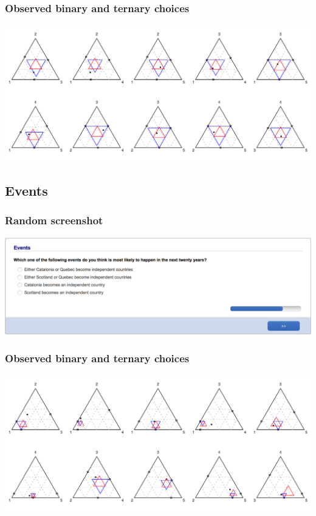 \documentclass[11pt,letter]{article}
\begin{document}
\subsubsection*{Observed binary and ternary choices}

\includegraphics[width=15cm]{./Population_study_data/Simplexes/Colour_Pairs.pdf}

\pagebreak

\subsection{Events}



\subsubsection*{Random screenshot}

\includegraphics[width=15cm]{Population_study_design/screenshot_Events.png}

\subsubsection*{Observed binary and ternary choices}

\includegraphics[width=15cm]{./Population_study_data/Simplexes/Events.pdf}
\end{document}
